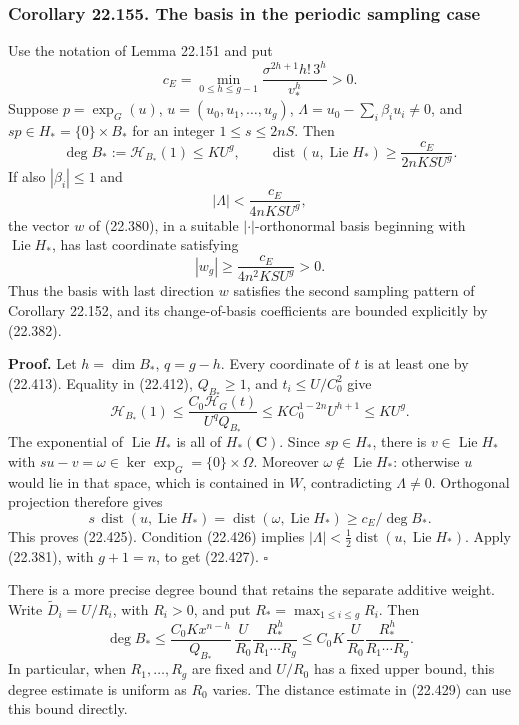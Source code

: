 \documentclass[
  11pt,
  a4paper,
]{article}
\begin{document}
\subsubsection{Corollary 22.155. The basis in the periodic sampling
case}\label{corollary-22.155.-the-basis-in-the-periodic-sampling-case}

Use the notation of Lemma 22.151 and put \[
 c_E=\min_{0\le h\le g-1}
                  \frac{\sigma^{2h+1}h!\,3^h}{v_*^h}>0.
 \tag{22.424}
\] Suppose \(p=\exp_G(u)\), \(u=(u_0,u_1,\ldots,u_g)\),
\(\Lambda=u_0-\sum_i\beta_i u_i\ne0\), and \(sp\in H_*=\{0\}\times B_*\)
for an integer \(1\le s\le2nS\). Then \[
 \deg B_*:=\mathcal H_{B_*}(1)\le K U^g,\qquad
 \operatorname{dist}(u,\operatorname{Lie}H_*)
                  \ge\frac{c_E}{2nKSU^g}.
 \tag{22.425}
\] If also \(|\beta_i|\le1\) and \[
 |\Lambda|<\frac{c_E}{4nKSU^g},
 \tag{22.426}
\] the vector \(w\) of (22.380), in a suitable \(|\cdot|\)-orthonormal
basis beginning with \(\operatorname{Lie}H_*\), has last coordinate
satisfying \[
 |w_g|\ge\frac{c_E}{4n^2KSU^g}>0.
 \tag{22.427}
\] Thus the basis with last direction \(w\) satisfies the second
sampling pattern of Corollary 22.152, and its change-of-basis
coefficients are bounded explicitly by (22.382).

\textbf{Proof.} Let \(h=\dim B_*\), \(q=g-h\). Every coordinate of \(t\)
is at least one by (22.413). Equality in (22.412), \(Q_{B_*}\ge1\), and
\(t_i\le U/C_0^2\) give \[
 \mathcal H_{B_*}(1)
 \le\frac{C_0\mathcal H_G(t)}{U^q Q_{B_*}}
 \le K C_0^{1-2n}U^{h+1}
 \le K U^g.
 \tag{22.428}
\] The exponential of \(\operatorname{Lie}H_*\) is all of
\(H_*(\mathbf C)\). Since \(sp\in H_*\), there is
\(v\in\operatorname{Lie}H_*\) with
\(su-v=\omega\in\ker\exp_G=\{0\}\times\Omega\). Moreover
\(\omega\notin\operatorname{Lie}H_*\): otherwise \(u\) would lie in that
space, which is contained in \(W\), contradicting \(\Lambda\ne0\).
Orthogonal projection therefore gives \[
 s\,\operatorname{dist}(u,\operatorname{Lie}H_*)
 =\operatorname{dist}(\omega,\operatorname{Lie}H_*)
 \ge c_E/\deg B_*.
 \tag{22.429}
\] This proves (22.425). Condition (22.426) implies
\(|\Lambda|<\tfrac12\operatorname{dist}(u,\operatorname{Lie}H_*)\).
Apply (22.381), with \(g+1=n\), to get (22.427). \(\square\)

There is a more precise degree bound that retains the separate additive
weight. Write \(\widetilde D_i=U/R_i\), with \(R_i>0\), and put
\(R_*=\max_{1\le i\le g}R_i\). Then \[
 \deg B_*
 \le \frac{C_0Kx^{n-h}}{Q_{B_*}}\,
       \frac{U}{R_0}\frac{R_*^h}{R_1\cdots R_g}
 \le C_0K\,\frac{U}{R_0}\frac{R_*^h}{R_1\cdots R_g}.
 \tag{22.430}
\] In particular, when \(R_1,\ldots,R_g\) are fixed and \(U/R_0\) has a
fixed upper bound, this degree estimate is uniform as \(R_0\) varies.
The distance estimate in (22.429) can use this bound directly.
\end{document}
